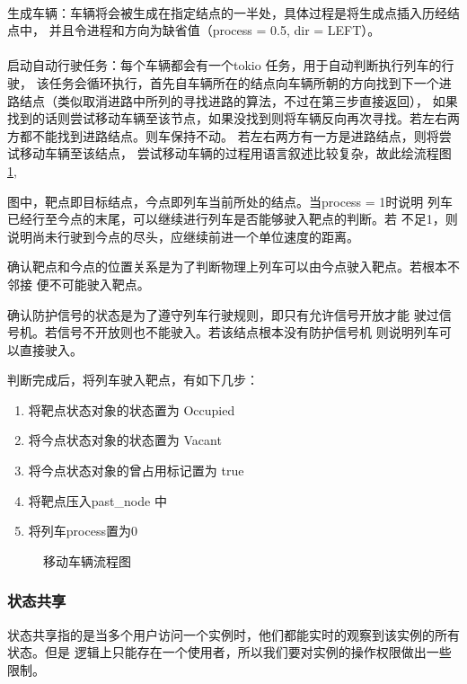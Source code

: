 \paragraph{}生成车辆：车辆将会被生成在指定结点的一半处，具体过程是将生成点插入历经结点中，
并且令进程和方向为缺省值（process = 0.5, dir = LEFT）。

\paragraph{}启动自动行驶任务：每个车辆都会有一个tokio 任务，用于自动判断执行列车的行驶，
该任务会循环执行，首先自车辆所在的结点向车辆所朝的方向找到下一个进路结点（类似取消进路中所列的寻找进路的算法，不过在第三步直接返回），
如果找到的话则尝试移动车辆至该节点，如果没找到则将车辆反向再次寻找。若左右两方都不能找到进路结点。则车保持不动。
若左右两方有一方是进路结点，则将尝试移动车辆至该结点，
尝试移动车辆的过程用语言叙述比较复杂，故此绘流程图 \ref{tmf},

图中，靶点即目标结点，今点即列车当前所处的结点。当process = 1时说明
列车已经行至今点的末尾，可以继续进行列车是否能够驶入靶点的判断。若
不足1，则说明尚未行驶到今点的尽头，应继续前进一个单位速度的距离。

确认靶点和今点的位置关系是为了判断物理上列车可以由今点驶入靶点。若根本不邻接
便不可能驶入靶点。

确认防护信号的状态是为了遵守列车行驶规则，即只有允许信号开放才能
驶过信号机。若信号不开放则也不能驶入。若该结点根本没有防护信号机
则说明列车可以直接驶入。

判断完成后，将列车驶入靶点，有如下几步：

\begin{enumerate}[\indent i.]
    \item 将靶点状态对象的状态置为 Occupied
    \item 将今点状态对象的状态置为 Vacant
    \item 将今点状态对象的曾占用标记置为 true
    \item 将靶点压入past\_node 中
    \item 将列车process置为0
\end{enumerate}

\begin{figure}[htbp!]
    \centering
    
    \caption{\label{tmf}移动车辆流程图}
\end{figure}

\subsubsection{状态共享}
状态共享指的是当多个用户访问一个实例时，他们都能实时的观察到该实例的所有状态。但是
逻辑上只能存在一个使用者，所以我们要对实例的操作权限做出一些限制。

